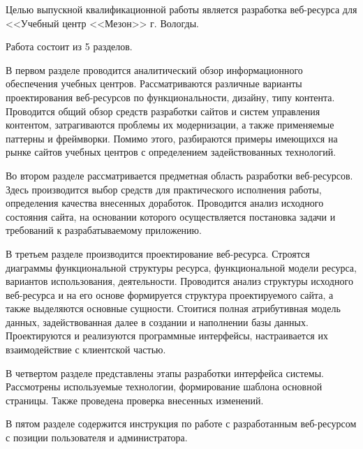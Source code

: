 Целью выпускной квалификационной работы является разработка веб-ресурса для <<Учебный центр <<Мезон>> г. Вологды.

Работа состоит из 5 разделов.

В первом разделе проводится аналитический обзор информационного обеспечения учебных центров.
Рассматриваются различные варианты проектирования веб-ресурсов по функциональности, дизайну, типу контента.
Проводится общий обзор средств разработки сайтов и систем управления контентом, затрагиваются проблемы их модернизации, а также применяемые паттерны и фреймворки.
Помимо этого, разбираются примеры имеющихся на рынке сайтов учебных центров с определением задействованных технологий.

Во втором разделе рассматривается предметная область разработки веб-ресурсов.
Здесь производится выбор средств для практического исполнения работы, определения качества внесенных доработок.
Проводится анализ исходного состояния сайта, на основании которого осуществляется постановка задачи и требований к разрабатываемому приложению.

В третьем разделе производится проектирование веб-ресурса.
Строятся диаграммы функциональной структуры ресурса, функциональной модели ресурса, вариантов использования, деятельности.
Проводится анализ структуры исходного веб-ресурса и на его основе формируется структура проектируемого сайта, а также выделяются основные сущности.
Стоитися полная атрибутивная модель данных, задействованная далее в создании и наполнении базы данных.
Проектируются и реализуются программные интерфейсы, настраивается их взаимодействие с клиентской частью.

В четвертом разделе представлены этапы разработки интерфейса системы.
Рассмотрены используемые технологии, формирование шаблона основной страницы.
Также проведена проверка внесенных изменений.

В пятом разделе содержится инструкция по работе с разработанным веб-ресурсом с позиции пользователя и администратора.

\clearpage
